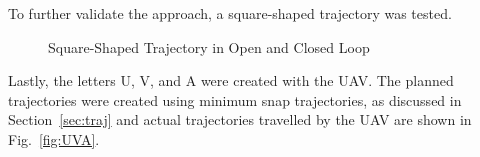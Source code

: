 \documentclass[letterpaper, 10 pt, conference]{ieeeconf}  %
\begin{document}
To further validate the approach, a square-shaped trajectory was tested. 
\begin{figure}[h]
	\centering
	\caption{Square-Shaped Trajectory in Open and Closed Loop}
	\label{fig:sqr}
\end{figure}

Lastly, the letters U, V, and A were created with the UAV. The planned trajectories were created using minimum snap trajectories, as discussed in Section~\ref{sec:traj} and actual trajectories travelled by the UAV are shown in Fig.~\ref{fig:UVA}.
\end{document}
